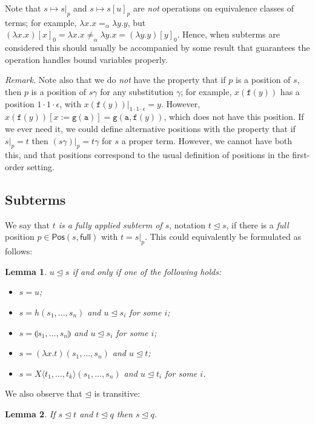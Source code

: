 \documentclass{lmcs}
\theoremstyle{theorem}\newtheorem{theorem}{Theorem}
\theoremstyle{theorem}\newtheorem{lemma}[theorem]{Lemma}
\theoremstyle{theorem}\newtheorem{corollary}[theorem]{Corollary}
\theoremstyle{definition}\newtheorem{definition}[theorem]{Definition}
\theoremstyle{definition}\newtheorem{example}[theorem]{Example}
\newcommand{\Positions}{\mathsf{Pos}}
\newcommand{\identifier}[1]{\mathtt{#1}}
\newcommand{\afun}{\identifier{f}}
\newcommand{\bfun}{\identifier{g}}
\newcommand{\Avar}{X}
\newcommand{\abs}[2]{\lambda #1.#2}
\newcommand{\meta}[2]{#1\langle#2\rangle}
\newcommand{\tuple}[2]{\llparenthesis #1,\dots,#2 \rrparenthesis}
\newcommand{\subtermeq}{\unlhd}
\begin{document}
Note that $s \mapsto s|_p$ and $s \mapsto s[u]_p$ are \emph{not} operations on
equivalence classes of terms; for example, $\abs{x}{x} =_\alpha \abs{y}{y}$, but
$(\abs{x}{x})[x]_0 = \abs{x}{x} \not =_\alpha \abs{y}{x} = (\abs{y}{y})[y]_0$.
Hence, when subterms are considered this should usually be accompanied by some
result that guarantees the operation handles bound variables properly.

\emph{Remark.}
Note also that we do \emph{not} have the property that if $p$ is a position of
$s$, then $p$ is a position of $s\gamma$ for any substitution $\gamma$; for
example, $x(\afun(y))$ has a position $1 \cdot 1 \cdot \epsilon$, with
$x(\afun(y))|_{1 \cdot 1 \cdot \epsilon} = y$.  However, $x(\afun(y))[x:=
\bfun(\identifier{a})] = \bfun(\identifier{a},\afun(y))$, which does not have
this position.  If we ever need it, we could define alternative positions with
the property that if $s|_p = t$ then $(s\gamma)|_p = t\gamma$ for $s$ a proper
term.  However, we cannot have both this, and that positions correspond to the
usual definition of positions in the first-order setting.

\subsection{Subterms}

We say that \emph{$t$ is a fully applied subterm of $s$}, notation $t
\subtermeq s$, if there is a \emph{full} position $p \in \Positions(s,
\mathsf{full})$ with $t = s|_p$.  This could equivalently be formulated as
follows:

\begin{lemma}
$u \subtermeq s$ if and only if one of the following holds:
\begin{itemize}
\item $s = u$;
\item $s = h(s_1,\dots,s_n)$ and $u \subtermeq s_i$ for some $i$;
\item $s = \tuple{s_1}{s_n}$ and $u \subtermeq s_i$ for some $i$;
\item $s = (\abs{x}{t})(s_1,\dots,s_n)$ and $u \subtermeq t$;
\item $s = \meta{\Avar}{t_1,\dots,t_k}(s_1,\dots,s_n)$ and $u \subtermeq t_i$
  for some $i$.
\end{itemize}
\end{lemma}

We also observe that $\subtermeq$ is transitive:

\begin{lemma}
If $s \subtermeq t$ and $t \subtermeq q$ then $s \subtermeq q$.
\end{lemma}
\end{document}
